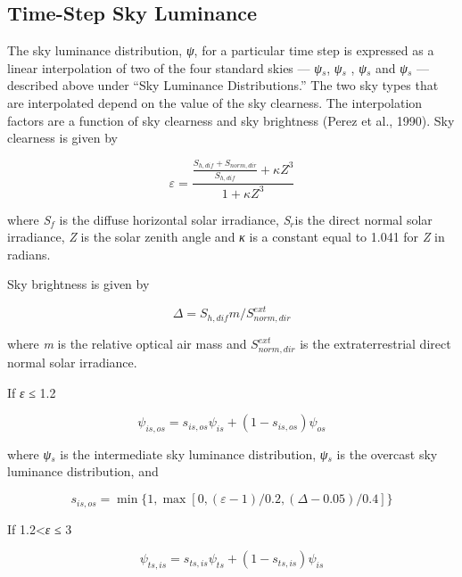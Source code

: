 \subsection{Time-Step Sky Luminance}\label{time-step-sky-luminance}

The sky luminance distribution, \emph{ψ}, for a particular time step is expressed as a linear interpolation of two of the four standard skies --- \emph{ψ\(_{s}\)}, \emph{ψ\(_{s}\)} , \emph{ψ\(_{s}\)} and \emph{ψ\(_{s}\)} --- described above under ``Sky Luminance Distributions.'' The two sky types that are interpolated depend on the value of the sky clearness. The interpolation factors are a function of sky clearness and sky brightness (Perez et al., 1990). Sky clearness is given by

\begin{equation}
\varepsilon  = \frac{{\frac{{{S_{h,dif}} + {S_{norm,dir}}}}{{{S_{h,dif}}}} + \kappa {Z^3}}}{{1 + \kappa {Z^3}}}
\end{equation}

where \emph{S\(_{f}\)} is the diffuse horizontal solar irradiance, \emph{S\(_{r}\)}is the direct normal solar irradiance, \emph{Z} is the solar zenith angle and \emph{κ} is a constant equal to 1.041 for \emph{Z} in radians.

Sky brightness is given by

\begin{equation}
\Delta  = {S_{h,dif}}m/S_{norm,dir}^{ext}
\end{equation}

where \emph{m} is the relative optical air mass and \(S_{norm,dir}^{ext}\) is the extraterrestrial direct normal solar irradiance.

If \emph{ε} ≤ 1.2

\begin{equation}
{\psi_{is,os}} = {s_{is,os}}{\psi_{is}} + (1 - {s_{is,os}}){\psi_{os}}
\end{equation}

where \emph{ψ\(_{s}\)} is the intermediate sky luminance distribution, \emph{ψ\(_{s}\)} is the overcast sky luminance distribution, and

\begin{equation}
{s_{is,os}} = \min \{ 1,\max [0,(\varepsilon  - 1)/0.2,(\Delta  - 0.05)/0.4]\}
\end{equation}

If 1.2\textless{}\emph{ε} ≤ 3

\begin{equation}
{\psi_{ts,is}} = {s_{ts,is}}{\psi_{ts}} + (1 - {s_{ts,is}}){\psi_{is}}
\end{equation}

